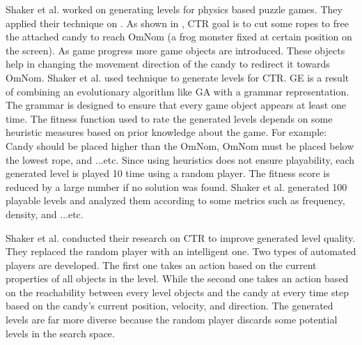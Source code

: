 Shaker et al.\cite{ctrAutomaticGeneration} worked on generating levels for physics based puzzle games. They applied their technique on . As shown in , CTR goal is to cut some ropes to free the attached candy to reach OmNom (a frog monster fixed at certain position on the screen). As game progress more game objects are introduced. These objects help in changing the movement direction of the candy to redirect it towards OmNom. Shaker et al. used  technique to generate levels for CTR. GE is a result of combining an evolutionary algorithm like GA with a grammar representation. The grammar is designed to ensure that every game object appears at least one time. The fitness function used to rate the generated levels depends on some heuristic measures based on prior knowledge about the game. For example: Candy should be placed higher than the OmNom, OmNom must be placed below the lowest rope, and ...etc. Since using heuristics does not ensure playability, each generated level is played 10 time using a random player. The fitness score is reduced by a large number if no solution was found. Shaker et al. generated 100 playable levels and analyzed them according to some metrics such as frequency, density, and ...etc.\\\par

Shaker et al.\cite{ctrSimulationApproach} conducted their research on CTR to improve generated level quality. They replaced the random player with an intelligent one. Two types of automated players are developed. The first one takes an action based on the current properties of all objects in the level. While the second one takes an action based on the reachability between every level objects and the candy at every time step based on the candy's current position, velocity, and direction. The generated levels are far more diverse because the random player discards some potential levels in the search space.\\\par

